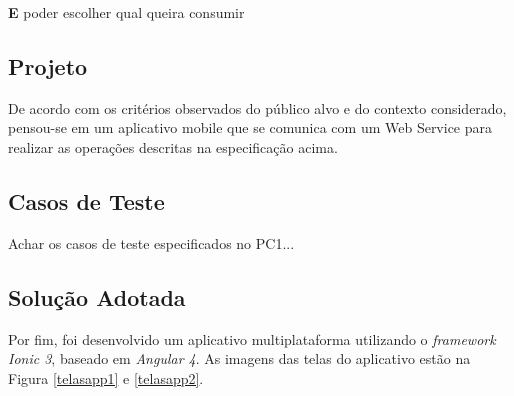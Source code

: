 \textbf{E} poder escolher qual queira consumir

\subsection{Projeto}

De acordo com os critérios observados do público alvo e do contexto considerado, pensou-se em um aplicativo mobile que se comunica com um Web Service para realizar as operações descritas na especificação acima.

\subsection{Casos de Teste}

Achar os casos de teste especificados no PC1...

\subsection{Solução Adotada}

Por fim, foi desenvolvido um aplicativo multiplataforma utilizando o \textit{framework Ionic 3}, baseado em \textit{Angular 4}. As imagens das telas do aplicativo estão na Figura \ref{telasapp1} e \ref{telasapp2}.

